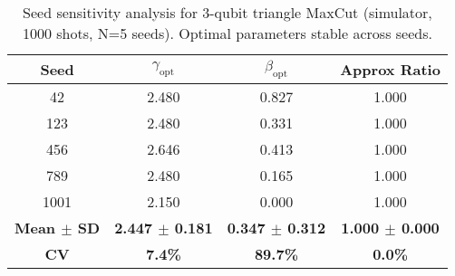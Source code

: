 
\begin{table}[H]
\centering
\caption{Seed sensitivity analysis for 3-qubit triangle MaxCut (simulator, 1000 shots, N=5 seeds). Optimal parameters stable across seeds.}
\label{tab:seed_sensitivity}
\begin{tabular}{cccc}
\toprule
\textbf{Seed} & \textbf{$\gamma_{\text{opt}}$} & \textbf{$\beta_{\text{opt}}$} & \textbf{Approx Ratio} \\
\midrule
42 & 2.480 & 0.827 & 1.000 \\
123 & 2.480 & 0.331 & 1.000 \\
456 & 2.646 & 0.413 & 1.000 \\
789 & 2.480 & 0.165 & 1.000 \\
1001 & 2.150 & 0.000 & 1.000 \\
\midrule
\textbf{Mean $\pm$ SD} & \textbf{2.447 $\pm$ 0.181} & \textbf{0.347 $\pm$ 0.312} & \textbf{1.000 $\pm$ 0.000} \\
\textbf{CV} & \textbf{7.4\%} & \textbf{89.7\%} & \textbf{0.0\%} \\
\bottomrule
\end{tabular}
\end{table}